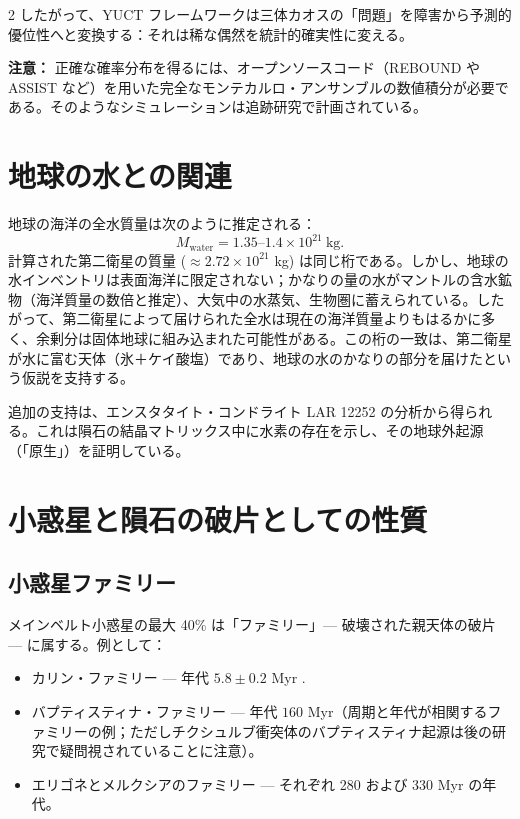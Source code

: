 \documentclass[12pt,a4paper]{article}
\begin{document}
\begin{multicols}{2}
		したがって、YUCT フレームワークは三体カオスの「問題」を障害から予測的優位性へと変換する：それは稀な偶然を統計的確実性に変える。
		
		\vspace{0.2cm}
		\noindent
		\textbf{注意：} 正確な確率分布を得るには、オープンソースコード（REBOUND や ASSIST など）を用いた完全なモンテカルロ・アンサンブルの数値積分が必要である。そのようなシミュレーションは追跡研究で計画されている。
		
		\section{地球の水との関連}
		地球の海洋の全水質量は次のように推定される：
		\[
		M_{\text{water}} = 1.35\text{–}1.4 \times 10^{21}\ \text{kg}.
		\]
		計算された第二衛星の質量 (\(\approx 2.72 \times 10^{21}\) kg) は同じ桁である。しかし、地球の水インベントリは表面海洋に限定されない；かなりの量の水がマントルの含水鉱物（海洋質量の数倍と推定）、大気中の水蒸気、生物圏に蓄えられている。したがって、第二衛星によって届けられた全水は現在の海洋質量よりもはるかに多く、余剰分は固体地球に組み込まれた可能性がある。この桁の一致は、第二衛星が水に富む天体（氷＋ケイ酸塩）であり、地球の水のかなりの部分を届けたという仮説を支持する。
		
		追加の支持は、エンスタタイト・コンドライト LAR 12252 \cite{Gardiner2025} の分析から得られる。これは隕石の結晶マトリックス中に水素の存在を示し、その地球外起源（「原生」）を証明している。
		
		\section{小惑星と隕石の破片としての性質}
		\subsection{小惑星ファミリー}
		メインベルト小惑星の最大 40\% は「ファミリー」— 破壊された親天体の破片 — に属する。例として：
		\begin{itemize}
			\item カリン・ファミリー — 年代 \(5.8 \pm 0.2\) Myr \cite{Nesvorny2002}.
			\item バプティスティナ・ファミリー — 年代 \(160\) Myr（周期と年代が相関するファミリーの例；ただしチクシュルブ衝突体のバプティスティナ起源は後の研究で疑問視されていることに注意）。
			\item エリゴネとメルクシアのファミリー — それぞれ 280 および 330 Myr の年代。
		\end{itemize}
		

\end{multicols}
\end{document}
